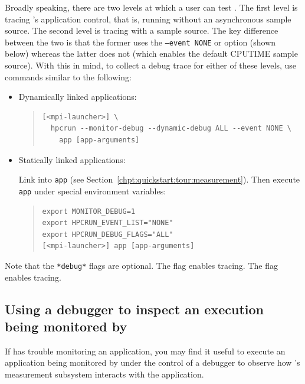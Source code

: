 \documentclass[11pt,letterpaper]{report}
\begin{document}
Broadly speaking, there are two levels at which a user can test \hpcrun{}.
The first level is tracing \hpcrun{}'s application control, that is, running \hpcrun{} without an asynchronous sample source.
The second level is tracing \hpcrun{} with a sample source.
The key difference between the two is that the former uses the \texttt{--event NONE} or  option (shown below) whereas the latter does not (which enables the default CPUTIME sample source).
With this in mind, to collect a debug trace for either of these levels, use commands similar to the following:
%
\begin{itemize}

\item Dynamically linked applications:\hfill
%
\begin{quote}
\begin{verbatim}
[<mpi-launcher>] \
  hpcrun --monitor-debug --dynamic-debug ALL --event NONE \
    app [app-arguments]
\end{verbatim}
\end{quote}

\item Statically linked applications:\hfill

Link \hpcrun{} into \texttt{app} (see Section~\ref{chpt:quickstart:tour:measurement}).
Then execute \texttt{app} under special environment variables:
\begin{quote}
\begin{verbatim}
export MONITOR_DEBUG=1
export HPCRUN_EVENT_LIST="NONE"
export HPCRUN_DEBUG_FLAGS="ALL"
[<mpi-launcher>] app [app-arguments]
\end{verbatim}
\end{quote}
\end{itemize}
%
Note that the \texttt{*debug*} flags are optional.
The  flag enables \libmonitor{} tracing.
The \mytt{--dynamic-debug/HPCRUN_DEBUG_FLAGS} flag enables \hpcrun{} tracing.



\subsection{Using a debugger to inspect an execution being monitored by \HPCToolkit{}}

If \HPCToolkit{} has trouble monitoring an application, you may find it useful to 
execute an application being monitored by \HPCToolkit{} under the control 
of a debugger to observe how \HPCToolkit{}'s measurement subsystem interacts with the application.
\end{document}
